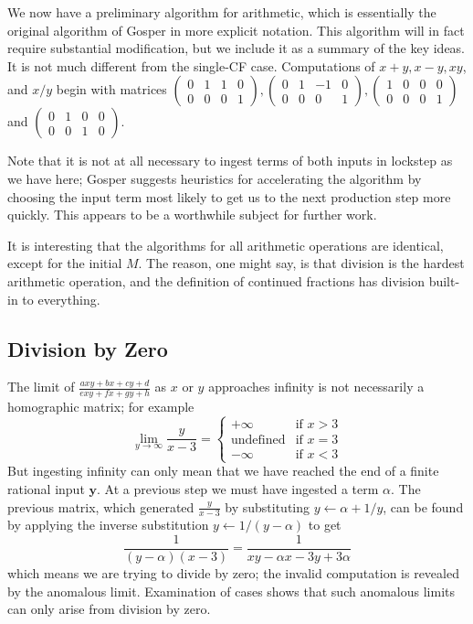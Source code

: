 \documentclass[11pt, oneside]{amsart}   	%
\newcommand{\bihomographic}[8]{\left(\begin{smallmatrix}#1&#2&#3&#4\\#5&#6&#7&#8\end{smallmatrix}\right)}
\renewcommand{\:}{\negthickspace:\negthickspace}
\begin{document}
We now have a preliminary algorithm for arithmetic, which is essentially the original algorithm of Gosper in more explicit notation. 
This algorithm will in fact require substantial modification, but we include it as a summary
of the key ideas. It is not much different from the single-CF case. Computations of $x+y, x-y,xy$, and $x/y$ begin with matrices
$\bihomographic{0}{1}{1}{0}{0}{0}{0}{1}, \bihomographic{0}{1}{-1}{0}{0}{0}{0}{1},
\bihomographic{1}{0}{0}{0}{0}{0}{0}{1}$ and $\bihomographic{0}{1}{0}{0}{0}{0}{1}{0}$.

Note that it is not at all necessary to ingest terms of both inputs in lockstep as we have here;
Gosper suggests heuristics for accelerating the algorithm by choosing the input term most likely to get us to the next production step
more quickly. This appears to be a worthwhile subject for further work.

It is interesting that the algorithms for all arithmetic operations are identical, except for the initial $M$. The reason, one might say, is
that division is the hardest arithmetic operation, and the definition of continued fractions has division built-in to everything.


\subsection{Division by Zero}\label{sec:anomalous}
The limit of $\frac{axy + bx + cy + d}{exy + fx + gy + h}$ as $x$ or $y$ approaches infinity is not necessarily a homographic matrix; for example
\[
\lim_{y \to \infty} \frac{y}{x-3} = \begin{cases}
                                                          +\infty & \mbox{if } x > 3 \\
                                                          \mbox{undefined} & \mbox{if } x=3 \\
                                                          -\infty & \mbox{if } x < 3
                                                         \end{cases}
\]
But ingesting infinity can only mean that we have reached the end of a finite rational input $\mathbf{y}$. At a previous step we
must have ingested a term $\alpha$. The previous matrix, which generated $\frac{y}{x-3}$ by substituting $y \leftarrow \alpha + 1/y$, can be found by applying the inverse substitution $y \leftarrow 1/(y-\alpha)$ to get
\[
\frac{1}{(y-\alpha)(x-3)} = \frac{1}{xy - \alpha x -3y +3\alpha}
\]
which means we are trying to divide by zero; the invalid computation is revealed by the anomalous limit.
Examination of cases shows that such anomalous limits can only arise from division by zero.
\end{document}
